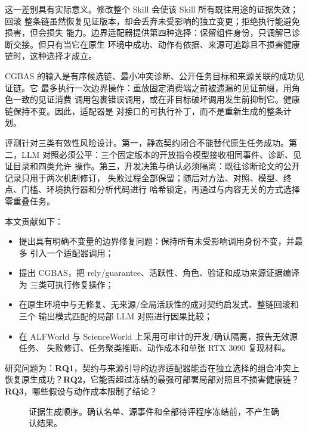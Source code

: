 \documentclass[10pt]{article}
\begin{document}
这一差别具有实际意义。修改整个 Skill 会使该 Skill 所有既往用途的证据失效；回滚
整条链虽然恢复见证版本，却会丢弃未受影响的独立变更；拒绝执行能避免损害，但会损失
能力。边界适配器提供第四种选择：保留组件身份，只调解已诊断交接。但只有当它在原生
环境中成功、动作有依据、来源可追踪且不损害健康链时，这种选择才成立。

CGBAS 的输入是有序候选链、最小冲突诊断、公开任务目标和来源关联的成功见证链。它
最多执行一次边界操作：重放固定消费端之前被遗漏的见证前缀，用角色一致的见证消费
调用包裹错误调用，或在非目标破坏调用发生前抑制它。健康链保持不变。因此，适配器是
对接口的可执行补丁，而不是重新生成的整条计划。

评测针对三类有效性风险设计。第一，静态契约闭合不能替代原生任务成功。第二，LLM
对照必须公平：三个固定版本的开放指令模型接收相同事件、诊断、见证目录和四类允许
操作。第三，开发决策与确认必须隔离：既往诊断论文的公开记录只用于两次机制修订，
失败过程全部保留；随后对方法、对照、模型、终点、门槛、环境执行器和分析代码进行
哈希锁定，再通过与内容无关的方式选择零重叠任务。

本文贡献如下：
\begin{itemize}
  \item 提出具有明确不变量的边界修复问题：保持所有未受影响调用身份不变，并最多
  引入一个适配器调用；
  \item 提出 CGBAS，把 rely/guarantee、活跃性、角色、验证和成功来源证据编译为
  三类可执行修复操作；
  \item 在原生环境中与无修复、无来源/全局活跃性的成对契约启发式、整链回滚和三个
  输出模式匹配的局部 LLM 对照进行因果比较；
  \item 在 ALFWorld 与 ScienceWorld 上采用可审计的开发/确认隔离，报告无效源任务、
  失败修订、任务聚类推断、动作成本和单张 RTX 3090 复现材料。
\end{itemize}

研究问题为：\textbf{RQ1}，契约与来源引导的边界适配器能否在独立选择的组合冲突上
恢复原生成功？\textbf{RQ2}，它能否超过冻结的最强可部署局部对照且不损害健康链？
\textbf{RQ3}，哪些假设与动作成本限制了结论？

\begin{figure}[t]
\centering
{}
\caption{证据生成顺序。确认名单、源事件和全部待评程序冻结前，不产生确认结果。}
\label{fig:evidence-order}
\end{figure}
\end{document}
